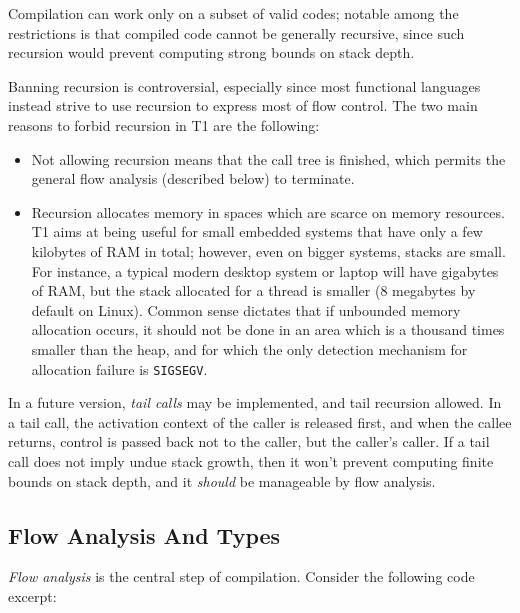 Compilation can work only on a subset of valid codes; notable among the
restrictions is that compiled code cannot be generally recursive, since
such recursion would prevent computing strong bounds on stack depth.

\begin{rationale}

Banning recursion is controversial, especially since most functional
languages instead strive to use recursion to express most of flow
control. The two main reasons to forbid recursion in T1 are the
following:
\begin{itemize}

    \item Not allowing recursion means that the call tree is finished,
    which permits the general flow analysis (described below) to
    terminate.

    \item Recursion allocates memory in spaces which are scarce on
    memory resources. T1 aims at being useful for small embedded systems
    that have only a few kilobytes of RAM in total; however, even on
    bigger systems, stacks are small. For instance, a typical modern
    desktop system or laptop will have gigabytes of RAM, but the stack
    allocated for a thread is smaller (8 megabytes by default on Linux).
    Common sense dictates that if unbounded memory allocation occurs, it
    should not be done in an area which is a thousand times smaller than
    the heap, and for which the only detection mechanism for allocation
    failure is \verb|SIGSEGV|.

\end{itemize}

In a future version, \emph{tail calls} may be implemented, and tail
recursion allowed. In a tail call, the activation context of the caller
is released first, and when the callee returns, control is passed back
not to the caller, but the caller's caller. If a tail call does not
imply undue stack growth, then it won't prevent computing finite bounds
on stack depth, and it \emph{should} be manageable by flow analysis.

\end{rationale}

\subsection{Flow Analysis And Types}

\emph{Flow analysis} is the central step of compilation. Consider
the following code excerpt:


